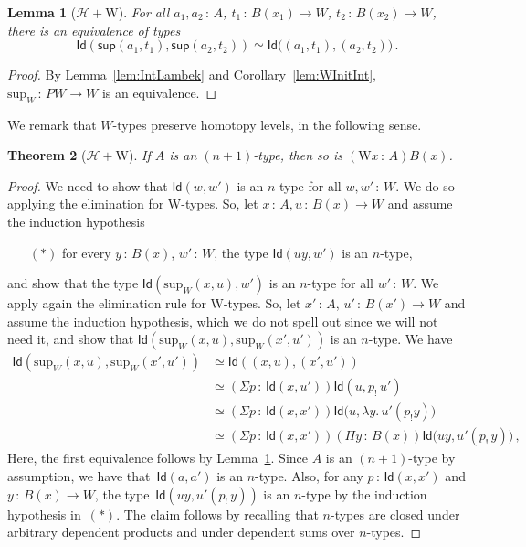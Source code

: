 \documentclass[10pt,a4paper,oneside,reqno]{amsart}
\numberwithin{equation}{section}
\theoremstyle{mythm}
\newtheorem{theorem}{Theorem}[subsection]
\newtheorem{lemma}[theorem]{Lemma}
\theoremstyle{mydef}
\theoremstyle{myrmk}
\newcommand{\co}{\,{:}\,}
\newcommand{\Hint}{\mathcal{H}}
\newcommand{\Id}{\mathsf{Id}}
\newcommand{\W}{\mathrm{W}}
\newcommand{\wsup}{\mathsf{sup}}
\renewcommand{\sup}{\mathrm{sup}}
\begin{document}
\begin{lemma}[$\Hint + \W$]\label{lem:suppath}
For all $a_1,a_2 \co A$, $t_1 \co B(x_1) \to W$, $t_2 \co B(x_2) \to W$, there is an equivalence of types
\[ 
\Id ( \wsup(a_1,t_1),  \wsup(a_2,t_2)  ) \simeq  \Id \big( (a_1,t_1), (a_2,t_2) \big) \, . 
\]
\end{lemma}

\begin{proof}
By Lemma~\ref{lem:IntLambek} and Corollary~\ref{lem:WInitInt}, $\sup_W \co PW \to W$ is an equivalence.
\end{proof}





We  remark that $W$-types  preserve homotopy levels, in the following sense.

\begin{theorem}[$\Hint + \W$]
If $A$ is an $(n+1)$-type, then so is $(\W x \co A) B(x)$.
\end{theorem}


\begin{proof}
We need to show that $\Id(w, w')$ is an $n$-type for all $w, w' \co W$. We do so applying the elimination for W-types.
So, let $x \co A, u \co B(x) \to W$ and assume the induction hypothesis 
\begin{itemize}
\item[$(\ast)$] for every $y \co B(x)$, $w' \co W$, the type $\Id( uy ,w')$ is an $n$-type, 
\end{itemize}
and show that  the type $\Id(\sup_W(x,u), w')$ is an $n$-type for all $w' \co W$. We apply again the elimination rule for W-types. So, let   $x' \co A$, $u' \co B(x') \to W$ and assume the induction hypothesis, which we do not spell out since we will not need it, and show that $\Id( \sup_W(x,u) , \sup_W(x',u'))$ is an $n$-type. We have
\begin{align*} 
\Id(\sup_W(x,u), \sup_W(x',u'))
& \simeq \Id((x,u) , (x',u')) \\
& \simeq (\Sigma p \co \Id(x, u')) \Id( u , p_{!} \, u' )   \\
& \simeq (\Sigma p \co \Id(x,x'))  \Id\big(u , \lambda y. \,  u'( p_{!} y)\big) \\
& \simeq (\Sigma p \co \Id(x,x')) (\Pi y \co B(x)) \Id \big( uy  , u'(p_{!} \, y)\big) \, , 
\end{align*}
Here, the first equivalence follows by Lemma~\ref{lem:suppath}. Since $A$ is an $(n+1)$-type by assumption, we have 
that~$\Id(a,a')$ is an $n$-type. Also, for any $p \co \Id(x,x')$ and $y \co B(x) \to W$, the type~$\Id(uy ,  u'(p_{!} \, y))$ is an $n$-type by the 
induction 
hypothesis in~$(\ast)$. The claim follows by recalling that $n$-types are closed under arbitrary dependent products and under dependent 
sums over $n$-types. 
\end{proof}
\end{document}
